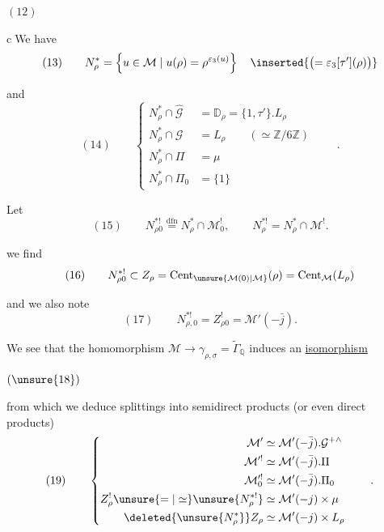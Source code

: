 \begin{samepage}
\( (12) \)\quad
{}
\end{samepage}


\textcircled{c}\quad We have
\[
(13)\qquad
N_\rho^*=\left\{u\in\mathcal M\mid u(\rho)=\rho^{\varepsilon_3(u)}\right\}
\quad\inserted{\bigl(=\varepsilon_3[\tau'](\rho)\bigr)}
\]

and
\[
(14)\qquad
\left\{\begin{aligned}
N_\rho^*\cap\widehat{\mathcal G}
  &=\mathbb D_\rho=\{1,\tau'\}.L_\rho\\
N_\rho^*\cap\mathcal G
  &=L_\rho\qquad(\simeq\mathbb Z/6\mathbb Z)\\
N_\rho^*\cap\Pi&=\mu\\
N_\rho^*\cap\Pi_0&=\{1\}
\end{aligned}\right.\qquad .
\]


Let
\[
(15)\qquad
N_{\rho0}^{*!}\overset{\mathrm{dfn}}=N_\rho^*\cap\mathcal M_0^!,
\qquad N_\rho^{*!}=N_\rho^*\cap\mathcal M^!.
\]

we find
\[
(16)\qquad
N_{\rho0}^{*!}\subset Z_\rho
=\operatorname{Cent}_{\unsure{\mathcal M(0)|\mathcal M}}(\rho)
=\operatorname{Cent}_{\mathcal M}(L_\rho)
\]

and we also note
\[
(17)\qquad N_{\rho,0}^{*!}=Z_{\rho0}^{!}=\mathcal M'(-\bar j).
\]

We see that the homomorphism $\mathcal M\to\gamma_{\rho,\sigma}
=\widetilde{\Gamma}_{\mathbb Q}$ induces an \uline{isomorphism}

\( (\unsure{18}) \)\quad
{}

from which we deduce splittings into semidirect products
(or even direct products)
\[
(19)\qquad
\left\{\begin{aligned}
\mathcal M'&\simeq\mathcal M'(-\bar j).\mathcal G^{+\wedge}\\
\mathcal M^{\prime!}&\simeq\mathcal M'(-\bar j).\Pi\\
\mathcal M_0^{\prime!}&\simeq\mathcal M'(-\bar j).\Pi_0\\
Z_\rho^!\unsure{=|\simeq}\unsure{N_\rho^{*!}}
  &\simeq\mathcal M'(-j)\times\mu\\
\deleted{\unsure{N_\rho^*}}Z_\rho
  &\simeq\mathcal M'(-j)\times L_\rho
\end{aligned}\right.\qquad .
\]

